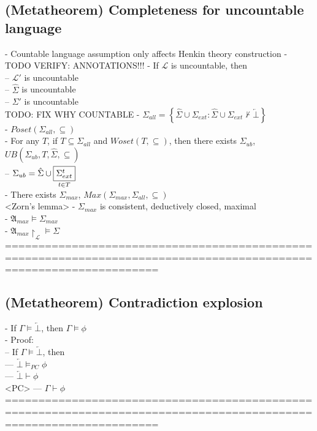 \documentclass{book}
\newcommand{\inot}{\not}
\newcommand{\contr}{\overleftarrow{\bot}}
\newcommand{\set}[1]{\left\{ #1 \right\}}
\newcommand{\vdc}[3]{\underset{#2}{\overset{#3}{\fbox{$#1$}}}}
\begin{document}
\subsection{(Metatheorem) Completeness for uncountable language} %
	- Countable language assumption only affects Henkin theory construction
	- TODO VERIFY: ANNOTATIONS!!! %
	- If $\mathcal{L}$ is uncountable, then \\
		-- $\mathcal{L}'$ is uncountable \\
		-- $\hat{\Sigma}$ is uncountable \\
		-- $\Sigma'$ is uncountable \\ TODO: FIX WHY COUNTABLE
	- $\Sigma_{all} = \set{\hat{\Sigma} \cup \Sigma_{ext}: \hat{\Sigma} \cup \Sigma_{ext} \inot \vdash \contr}$ \\
	- $Poset(\Sigma_{all}, \subseteq)$ \\
	- For any $T$, if $T \subseteq \Sigma_{all}$ and $Woset(T, \subseteq)$, then there exists $\Sigma_{ub}$, $UB(\Sigma_{ub}, T, \hat{\Sigma}, \subseteq)$ \\
		-- $\Sigma_{ub} = \hat{\Sigma} \cup \vdc{\Sigma_{ext}^t}{t \in T}{ }$ \\
	- There exists $\Sigma_{max}$, $Max(\Sigma_{max}, \Sigma_{all}, \subseteq)$ \\ <Zorn's lemma>
	- $\Sigma_{max}$ is consistent, deductively closed, maximal \\
	- $\mathfrak{A}_{max} \vDash \Sigma_{max}$ \\
	- $\mathfrak{A}_{max} \upharpoonright_\mathcal{L} \vDash \Sigma$ \\
	===================================================================================================================
\subsection{(Metatheorem) Contradiction explosion} %
	- If $\Gamma \vDash \contr$, then $\Gamma \vDash \phi$ \\
	- Proof: \\
		-- If $\Gamma \vDash \contr$, then \\
			--- $\contr \vDash_{PC} \phi$ \\
			--- $\contr \vdash \phi$ \\ <PC>
			--- $\Gamma \vdash \phi$ \\
	===================================================================================================================
\end{document}
